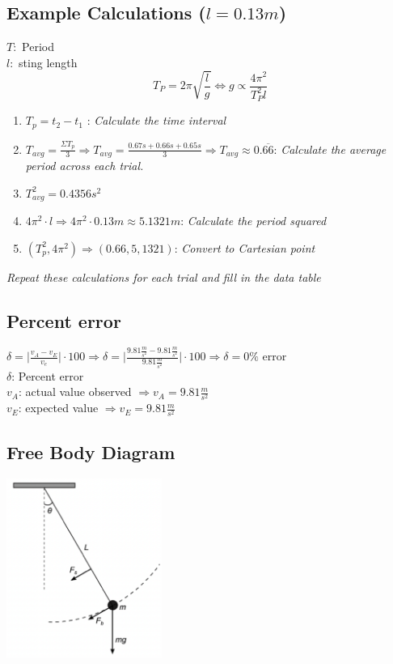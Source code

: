 \documentclass[11pt,letterpaper]{article}
\begin{document}
\subsection{Example Calculations (\textit {$l = 0.13m$})}
$T:$ Period \\ $l:$ sting length\\
$$T_{P}=2\pi \sqrt{\frac{l}{g}} \Longleftrightarrow g \propto \frac{4\pi ^2}{T_{P}^2l}$$
\begin{enumerate}
   \item $T_{p} = t_{2}-t_{1}$ : \textit {Calculate the time interval}
    \item $T_{avg}=\frac{\Sigma T_{p}}{3} \Rightarrow T_{avg}= \frac{0.67s + 0.66s + 0.65s}{3} \Rightarrow T_{avg} \approx 0.\overline{66}  $: \textit {Calculate the average period across each trial.}
    \item $T_{avg}^2= 0.4356 s^2$
    \item $4 \pi^2 \cdot l \Rightarrow 4 \pi^2 \cdot 0.13m \approx 5.1321m $: \textit { Calculate the period squared }
    \item $ (T_{p}^2, 4\pi^2) \Longrightarrow (0.66, 5,1321)$: \textit {Convert to Cartesian point}
\end{enumerate}
\textit{Repeat these calculations for each trial and fill in the data table}

\subsection{Percent error}
$\delta = \biggr|\frac{v_{A}-v_{E}}{v_{e}}\biggr| \cdot 100 \Rightarrow \delta = \biggr| \frac{9.81\frac{m}{s^2}-9.81\frac{m}{s^2}}{9.81 \frac{m}{s^2}}\biggr| \cdot 100 \Longrightarrow \delta =0 \%$ error
\\ $\delta$: Percent error
\\ $v_{A}$: actual value observed  $\Longrightarrow v_{A}= 9.81 \frac{m}{s^2}$
\\ $v_{E}$: expected value $\Longrightarrow v_{E}= 9.81 \frac{m}{s^2}$ 

\subsection{Free Body Diagram}
\begin{center}
   \includegraphics[width=2in]{FBD.png}
\end{center}
\pagebreak
\end{document}
